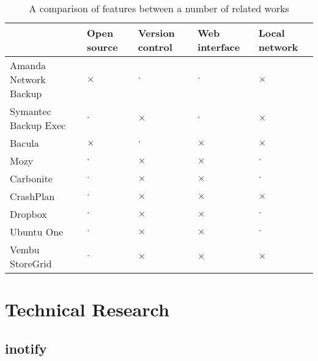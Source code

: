 \begin{table}[H]
    \centering
    \begin{tabular}{ | l | p{1.5cm} | p{1.5cm} | p{1.5cm} | p{1.5cm} | }
        \hline
        & Open source   & Version control   & Web interface & Local network
            \\ \hline

        Amanda Network Backup   & $\times$  & $\cdot$   & $\cdot$   & $\times$
            \\ \hline

        Symantec Backup Exec    & $\cdot$   & $\times$  & $\cdot$   & $\times$
            \\ \hline

        Bacula                  & $\times$  & $\cdot$   & $\times$  & $\times$
            \\ \hline

        Mozy                    & $\cdot$   & $\times$  & $\times$  & $\cdot$
            \\ \hline

        Carbonite               & $\cdot$   & $\times$  & $\times$  & $\cdot$
            \\ \hline

        CrashPlan               & $\cdot$   & $\times$  & $\times$  & $\times$
            \\ \hline

        Dropbox                 & $\cdot$   & $\times$  & $\times$  & $\cdot$
            \\ \hline

        Ubuntu One              & $\cdot$   & $\times$  & $\times$  & $\cdot$
            \\ \hline

        Vembu StoreGrid         & $\cdot$   & $\times$  & $\times$  & $\times$
            \\ \hline
    \end{tabular}
    \caption{A comparison of features between a number of related works}
    \label{tab:feature-comparison}
\end{table}

\section{Technical Research}

\subsection{inotify}

